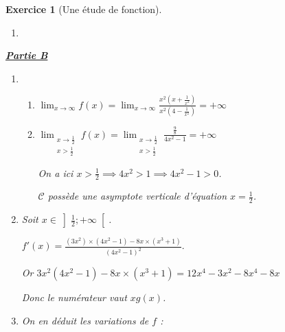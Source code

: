 \documentclass[12pt,a4paper]{article}
\theoremstyle{break}
\theoremstyle{nobreak}
\newtheorem{exercice}{Exercice}
\theoremstyle{nonumberplain}
\begin{document}
\begin{exercice}[Une étude de fonction]
\begin{enumerate}
      Remarque : la dernière ligne de cette algorithme permet surtout
      l'affichage de la ligne dessous avec \LaTeX{}.
    \item ~

      \begin{center}
      \end{center}

  \end{enumerate}

  \noindent\textbf{\underline{Partie B}}

  \begin{enumerate}
    \item
      \begin{enumerate}
        \item $\lim_{x\to \infty}f(x) = \lim_{x\to \infty}
          \frac{x^2\left(x+\frac1{x^2}\right)}{x^2\left(4 -
          \frac1{x^2}\right)} = +\infty$
        \item $\lim_{\substack{x\to \frac12\\x > \frac12}}f(x) =
          \lim_{\substack{x\to \frac12\\x > \frac12}}
          \frac{\frac98}{4x^2 -1} = +\infty$

          On a ici $x > \frac12 \implies 4x^2 > 1 \implies 4x^2 - 1 >
          0$.

          $\mathscr{C}$ possède une asymptote verticale d'équation $x =
          \frac12$.
      \end{enumerate}
    \item Soit $x\in \left]\frac12;+\infty\right[$.

        $f'(x) = \frac{(3x^2)\times(4x^2 -1) - 8x\times (x^3 +1) }{(4x^2 -
        1)^2}.$

        Or $3x^2(4x^2 -1) - 8x\times (x^3 +1) = 12x^4 - 3x^2 - 8x^4 -
        8x$

        Donc le numérateur vaut $xg(x)$.
    \item On en déduit les variations de $f$ :



\end{enumerate}
\end{exercice}
\end{document}
